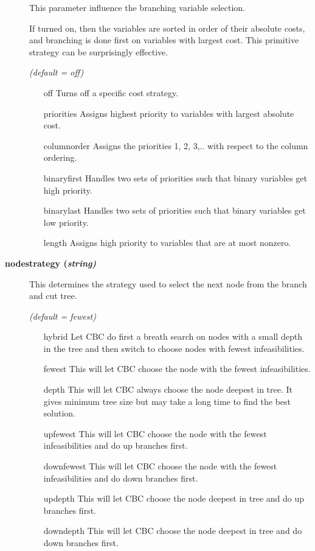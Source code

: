 \begin{description}
This parameter influence the branching variable selection.

If turned on, then the variables are sorted in order of their absolute costs, and branching is done first on variables with largest cost.
This primitive strategy can be surprisingly effective.

\textsl{(default = off)}
\begin{itemize}
\item[off] 
Turns off a specific cost strategy.
\item[priorities] 
Assigns highest priority to variables with largest absolute cost.
\item[columnorder] 
Assigns the priorities 1, 2, 3,.. with respect to the column ordering.
\item[binaryfirst] 
Handles two sets of priorities such that binary variables get high priority.
\item[binarylast] 
Handles two sets of priorities such that binary variables get low priority.
\item[length] 
Assigns high priority to variables that are at most nonzero.
\end{itemize}

\item[\label{nodestrategy}\hypertarget{nodestrategy}
{\textbf{nodestrategy (\slshape{string})}}]\hspace{1.0in}

This determines the strategy used to select the next node from the branch and cut tree.

\textsl{(default = fewest)}
\begin{itemize}
\item[hybrid] 
Let CBC do first a breath search on nodes with a small depth in the tree and then switch to choose nodes with fewest infeasibilities.
\item[fewest] 
This will let CBC choose the node with the fewest infeasibilities.
\item[depth] 
This will let CBC always choose the node deepest in tree.
It gives minimum tree size but may take a long time to find the best solution.
\item[upfewest] 
This will let CBC choose the node with the fewest infeasibilities and do up branches first.
\item[downfewest] 
This will let CBC choose the node with the fewest infeasibilities and do down branches first.
\item[updepth] 
This will let CBC choose the node deepest in tree and do up branches first.
\item[downdepth] 
This will let CBC choose the node deepest in tree and do down branches first.
\end{itemize}


\end{description}
